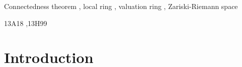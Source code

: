 \documentclass[preprint, 11pt,nonatbib]{elsarticle}
\DeclareMathOperator{\Dom}{Val}
\theoremstyle{definition}
\numberwithin{theorem}{section}
\begin{document}
\begin{frontmatter}
\begin{abstract}
Let $F$ be a field,  let $D$ be a  
local subring of $F$, and let $\Dom_F(D)$ be the space of valuation rings of $F$ that dominate $D$. We lift Zariski's connectedness theorem for fibers of a projective morphism  to the Zariski-Riemann space of  valuation rings of $F$ by proving that 
 a subring $R$ of $F$ dominating $D$  is local, residually algebraic over $D$ and integrally closed in $F$ if and only if there is a closed and connected subspace $Z$  of $\Dom_F(D)$ such that $R$ is the  intersection of the rings in $Z$.
 Consequently, the intersection of the rings in any closed and connected subset of $\Dom_F(D)$ is a local ring. 
 In proving this, we also prove a converse to 
 Zariski's connectedness theorem. Our results do not  require   the rings involved to be Noetherian. 
%


\end{abstract}



\begin{keyword}
Connectedness theorem \sep
local ring \sep
valuation ring \sep
Zariski-Riemann space 
  

\MSC 13A18 \sep 13H99





\end{keyword}

\end{frontmatter}




\section{Introduction}
\end{document}
